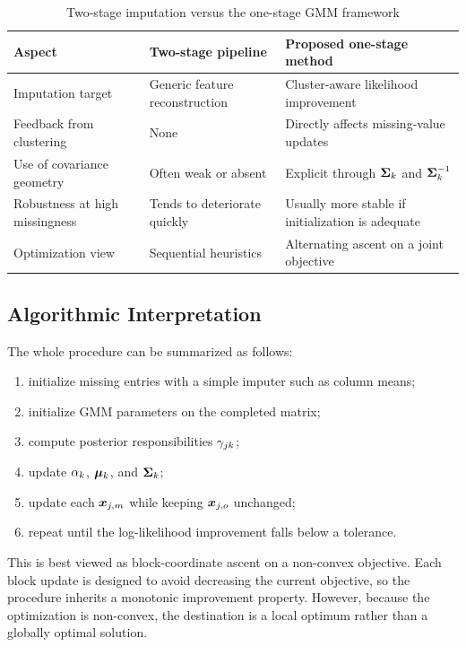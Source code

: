 \begin{table}[t]
    \caption{Two-stage imputation versus the one-stage GMM framework}
    \label{tab:one-stage-vs-two-stage}
    \centering
    \begin{tabularx}{\linewidth}{@{}lX X@{}}
        \toprule
        Aspect & Two-stage pipeline & Proposed one-stage method \\
        \midrule
        Imputation target & Generic feature reconstruction & Cluster-aware likelihood improvement \\
        Feedback from clustering & None & Directly affects missing-value updates \\
        Use of covariance geometry & Often weak or absent & Explicit through $\mathbf{\Sigma}_k$ and $\mathbf{\Sigma}_k^{-1}$ \\
        Robustness at high missingness & Tends to deteriorate quickly & Usually more stable if initialization is adequate \\
        Optimization view & Sequential heuristics & Alternating ascent on a joint objective \\
        \bottomrule
    \end{tabularx}
\end{table}

\subsection{Algorithmic Interpretation}
The whole procedure can be summarized as follows:
\begin{enumerate}
    \item initialize missing entries with a simple imputer such as column means;
    \item initialize GMM parameters on the completed matrix;
    \item compute posterior responsibilities $\gamma_{jk}$;
    \item update $\alpha_k$, $\bm{\mu}_k$, and $\mathbf{\Sigma}_k$;
    \item update each $\bm{x}_{j,m}$ while keeping $\bm{x}_{j,o}$ unchanged;
    \item repeat until the log-likelihood improvement falls below a tolerance.
\end{enumerate}

This is best viewed as block-coordinate ascent on a non-convex objective. Each block update is designed to avoid decreasing the current objective, so the procedure inherits a monotonic improvement property. However, because the optimization is non-convex, the destination is a local optimum rather than a globally optimal solution.

